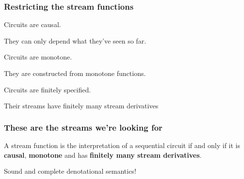\begin{frame}
    \frametitle{Restricting the stream functions}

    \await
    \Large
    Circuits are \alert{causal}.

    \await

    \normalsize
    They can only depend \alert{what they've seen so far}.

    \await

    \Large
    Circuits are \alert{monotone}.

    \await

    \normalsize
    They are constructed from \alert{monotone functions}.

    \await

    \Large
    Circuits are \alert{finitely specified}.

    \normalsize
    Their streams have \alert{finitely many stream derivatives}


\end{frame}
\begin{frame}
    \frametitle{These are the streams we're looking for}

    \Large

    \begin{theorem}
        A stream function is the interpretation of a sequential circuit
        if and only if it is \textbf{causal}, \textbf{monotone} and has
        \textbf{finitely many stream derivatives}.
    \end{theorem}

    \await

    \begin{center}
        \LARGE
        Sound and complete
        \alert{denotational semantics}!
    \end{center}
\end{frame}
